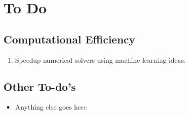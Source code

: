 \mynewpage
\chapter{To Do}

\section{Computational Efficiency}
\begin{enumerate}
\item Speedup numerical solvers using machine learning ideas.
\end{enumerate}

\section{Other To-do's}
\begin{itemize}
\item Anything else goes here
\end{itemize}

